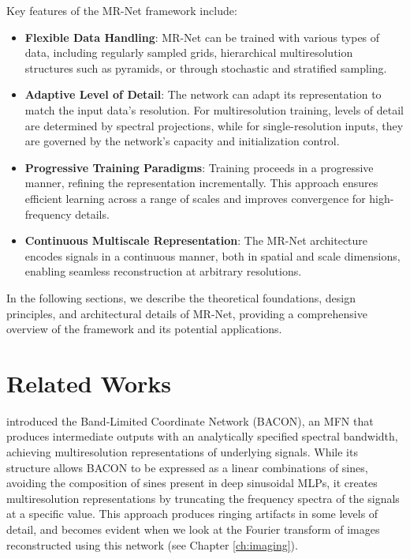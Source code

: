 Key features of the MR-Net framework include:

\begin{itemize}
    \item \textbf{Flexible Data Handling}: MR-Net can be trained with various types of data, including regularly sampled grids, hierarchical multiresolution structures such as pyramids, or through stochastic and stratified sampling.
    \item \textbf{Adaptive Level of Detail}: The network can adapt its representation to match the input data's resolution. For multiresolution training, levels of detail are determined by spectral projections, while for single-resolution inputs, they are governed by the network's capacity and initialization control.
    \item \textbf{Progressive Training Paradigms}: Training proceeds in a progressive manner, refining the representation incrementally. This approach ensures efficient learning across a range of scales and improves convergence for high-frequency details.
    \item \textbf{Continuous Multiscale Representation}: The MR-Net architecture encodes signals in a continuous manner, both in spatial and scale dimensions, enabling seamless reconstruction at arbitrary resolutions.
\end{itemize}

In the following sections, we describe the theoretical foundations, design principles, and architectural details of MR-Net, providing a comprehensive overview of the framework and its potential applications.


\section{Related Works}

\cite{bacon2021} introduced the Band-Limited Coordinate Network (BACON), an MFN that produces intermediate outputs with an analytically specified spectral bandwidth, achieving multiresolution representations of underlying signals. While its structure allows BACON to be expressed as a linear combinations of sines, avoiding the composition of sines present in deep sinusoidal MLPs, it creates multiresolution representations by truncating the frequency spectra of the signals at a specific value. This approach produces ringing artifacts in some levels of detail, and becomes evident when we look at the Fourier transform of images reconstructed using this network (see Chapter \ref{ch:imaging}).

